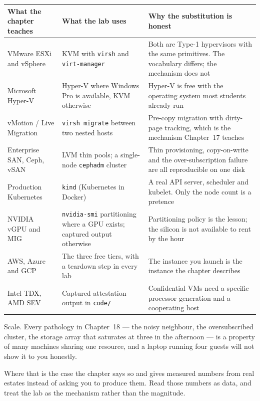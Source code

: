 \begin{longtable}{@{}L{4.2cm}L{5.2cm}L{5.6cm}@{}}
\toprule
{}
\textbf{What the chapter teaches} & \textbf{What the lab uses} &
\textbf{Why the substitution is honest} \\
\midrule
\endhead
VMware ESXi and vSphere & KVM with \texttt{virsh} and \texttt{virt-manager} &
Both are Type-1 hypervisors with the same primitives. The vocabulary differs;
the mechanism does not \\
Microsoft Hyper-V & Hyper-V where Windows Pro is available, KVM otherwise &
Hyper-V is free with the operating system most students already run \\
vMotion / Live Migration & \texttt{virsh migrate} between two nested hosts &
Pre-copy migration with dirty-page tracking, which is the mechanism
Chapter~17 teaches \\
Enterprise SAN, Ceph, vSAN & LVM thin pools; a single-node \texttt{cephadm}
cluster & Thin provisioning, copy-on-write and the over-subscription failure are
all reproducible on one disk \\
Production Kubernetes & \texttt{kind} (Kubernetes in Docker) & A real API
server, scheduler and kubelet. Only the node count is a pretence \\
NVIDIA vGPU and MIG & \texttt{nvidia-smi} partitioning where a GPU exists;
captured output otherwise & Partitioning policy is the lesson; the silicon is
not available to rent by the hour \\
AWS, Azure and GCP & The three free tiers, with a teardown step in every lab &
The instance you launch is the instance the chapter describes \\
Intel TDX, AMD SEV & Captured attestation output in \texttt{code/} & Confidential
VMs need a specific processor generation and a cooperating host \\
\bottomrule
\end{longtable}

\begin{alertbox}
Scale. Every pathology in Chapter~18 --- the noisy neighbour, the oversubscribed
cluster, the storage array that saturates at three in the afternoon --- is a
property of many machines sharing one resource, and a laptop running four guests
will not show it to you honestly.

\smallskip
Where that is the case the chapter says so and gives measured numbers from real
estates instead of asking you to produce them. Read those numbers as data, and
treat the lab as the mechanism rather than the magnitude.
\end{alertbox}


